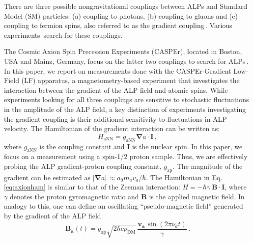 \documentclass[superscriptaddress,
floatfix,
reprint,
nofootinbib,
amsmath,amssymb,
aps,
prd,
]{revtex4-2}
\begin{document}
There are three possible nongravitational couplings between ALPs and Standard Model (SM) particles: (a) coupling to photons, (b) coupling to gluons and (c) coupling to fermion spins, also referred to as the gradient coupling\,\cite{Kimball2023_search}. Various experiments\,\cite{ouellet2019first,du2018search,ALPHA2023,aja2022canfranc,CAPP2024,brouwer2022projected,alesini2023future,zhong2018results,garcia2024searchaxiondarkmatter,quiskamp2024near,rettaroli2024search,Gramolin2021_Ferromagnetic,gavilan2024searching,bloch2105nasduck,wu2019search,abel2023search,karanth2023first,lee2023laboratory,capozzi2023new} search for these couplings.

The Cosmic Axion Spin Precession Experiments (CASPEr), located in Boston, USA and Mainz, Germany, focus on the latter two couplings to search for ALPs\,\cite{CASPErProposal2014, kimball2018overview, wang2018application, wu2019search, aybas2021_SolidStateNMR, CASPEr_ZULF_2019}. 
In this paper, we report on measurements done with the CASPEr-Gradient Low-Field (LF) apparatus, a magnetometry-based experiment that investigates the interaction between the gradient of the ALP field and atomic spins.
While experiments looking for all three couplings are sensitive to stochastic fluctuations in the amplitude of the ALP field, a key distinction of experiments investigating the gradient coupling is their additional sensitivity to fluctuations in ALP velocity. 
The Hamiltonian of the gradient interaction can be written as:
\begin{equation}
   H_{\mathrm{aNN}}=g_{\mathrm{aNN}}\bm{\nabla} a\cdot \mathbf{I}\,, 
   \label{eq:axionham}
\end{equation}
where $g_{\mathrm{aNN}}$ is the coupling constant and $\mathbf{I}$ is the nuclear spin. 
In this paper, we focus on a measurement using a spin-1/2 proton sample. 
Thus, we are effectively probing the ALP gradient-proton coupling constant, $g_{\mathrm{ap}}$. 
The magnitude of the gradient can be estimated as $|\bm{\nabla}a|\,\approx a_0 m_a v_a/\hbar$. 
The Hamiltonian in Eq.\,\eqref{eq:axionham} is similar to that of the Zeeman interaction: $H=-\hbar \gamma~\mathbf{B}\cdot \mathbf{I}$, where $\gamma$ denotes the proton gyromagnetic ratio and $\mathbf{B}$ is the applied magnetic field. 
In analogy to this, one can define an oscillating ``pseudo-magnetic field'' generated by the gradient of the ALP field
\begin{equation}
    \mathbf{B_a}(t)=g_{\mathrm{ap}}\sqrt{2\hbar c\rho_{\text{DM}}}\,\frac{ \bm{v_a}\,\sin(2\pi\nu_a t)}{\gamma}\,.
    \label{eq:pseudoB}
\end{equation}
\end{document}
